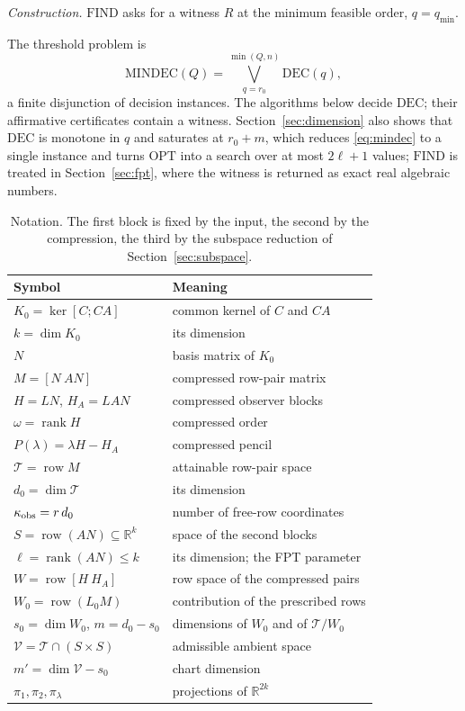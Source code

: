 \documentclass[journal]{IEEEtran}
\theoremstyle{plainn}
\theoremstyle{remark}
\begin{document}
\emph{Construction.} $\mathrm{FIND}$ asks for a witness $R$ at the minimum feasible
order, $q=q_{\min}$.

The threshold problem is
\begin{equation}\label{eq:mindec}
\mathrm{MINDEC}(Q)=\bigvee_{q=r_0}^{\min(Q,n)}\mathrm{DEC}(q),
\end{equation}
a finite disjunction of decision instances. The algorithms below decide $\mathrm{DEC}$;
their affirmative certificates contain a witness. Section~\ref{sec:dimension} also shows
that $\mathrm{DEC}$ is monotone in $q$ and saturates at $r_0+m$, which reduces
\eqref{eq:mindec} to a single instance and turns $\mathrm{OPT}$ into a search over at most
$2\ell+1$ values; $\mathrm{FIND}$ is treated in Section~\ref{sec:fpt}, where the witness is
returned as exact real algebraic numbers.

\begin{table}[!t]
\centering
\caption{Notation. The first block is fixed by the input, the second by the compression, the third by
the subspace reduction of Section~\ref{sec:subspace}.}
\label{tab:notation}
\footnotesize
\begin{tabular}{@{}ll@{}}
\toprule
Symbol & Meaning \\
\midrule
$K_0=\ker[C;CA]$ & common kernel of $C$ and $CA$ \\
$k=\dim K_0$ & its dimension \\
$N$ & basis matrix of $K_0$ \\
$M=[N\ AN]$ & compressed row-pair matrix \\
\midrule
$H=LN$, $H_A=LAN$ & compressed observer blocks \\
$\omega=\operatorname{rank}H$ & compressed order \\
$P(\lambda)=\lambda H-H_A$ & compressed pencil \\
\midrule
$\mathcal T=\operatorname{row}M$ & attainable row-pair space \\
$d_0=\dim\mathcal T$ & its dimension \\
$\kappa_{\rm obs}=r\,d_0$ & number of free-row coordinates \\
$S=\operatorname{row}(AN)\subseteq\mathbb R^k$ & space of the second blocks \\
$\ell=\operatorname{rank}(AN)\le k$ & its dimension; the FPT parameter \\
$W=\operatorname{row}[H\ H_A]$ & row space of the compressed pairs \\
$W_0=\operatorname{row}(L_0M)$ & contribution of the prescribed rows \\
$s_0=\dim W_0$, $m=d_0-s_0$ & dimensions of $W_0$ and of $\mathcal T/W_0$ \\
$\mathcal V=\mathcal T\cap(S\times S)$ & admissible ambient space \\
$m'=\dim\mathcal V-s_0$ & chart dimension \\
$\pi_1,\pi_2,\pi_\lambda$ & projections of $\mathbb R^{2k}$ \\
\bottomrule
\end{tabular}
\end{table}
\end{document}

